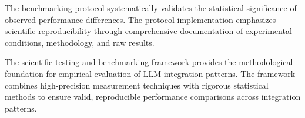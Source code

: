         
        
        

The benchmarking protocol systematically validates the statistical significance of observed performance differences. The protocol implementation emphasizes scientific reproducibility through comprehensive documentation of experimental conditions, methodology, and raw results.


The scientific testing and benchmarking framework provides the methodological foundation for empirical evaluation of LLM integration patterns. The framework combines high-precision measurement techniques with rigorous statistical methods to ensure valid, reproducible performance comparisons across integration patterns.
